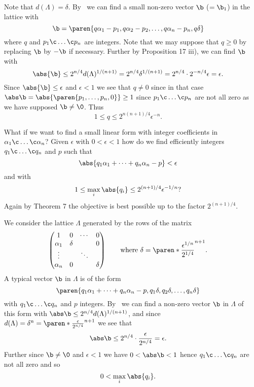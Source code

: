 Note that $d(\Lambda)=\delta$.  By \LLL\ we can find a small non-zero vector $\b$ ($=\b_1$) in the lattice with
\[ \b = \paren{q\alpha_1-p_1,q\alpha_2-p_2,\dotsc,q\alpha_n-p_n,q\delta} \]
where $q$ and $p_1\c \dotsc\c p_n$ are integers.  Note that we may suppose that $q\geq0$ by replacing $\b$ by $-\b$ if necessary.  Further by Proposition 17 iii), we can find $\b$ with
\[ \abs{\b} \leq 2^{n/4} d(\Lambda)^{1/(n+1)} = 2^{n/4}\delta^{1/(n+1)} = 2^{n/4}\cdot 2^{-n/4} \epsilon = \epsilon . \]
Since $\abs{\b}\leq\epsilon$ and $\epsilon<1$ we see that $q\neq0$ since in that case $\abs\b=\abs{\paren{p_1,\dotsc,p_n,0}}\geq1$ since $p_1\c \dotsc\c p_n$ are not all zero as we have supposed $\b\neq\0$.  Thus
\[ 1 \leq q \leq 2^{n(n+1)/4} \epsilon^{-n} . \]

What if we want to find a small linear form with integer coefficients in $\alpha_1\c \dotsc\c \alpha_n$?  Given $\epsilon$ with $0<\epsilon<1$ how do we find efficiently integers $q_1\c \dotsc\c q_n$ and $p$ such that
\[ \abs{q_1\alpha_1+\dotsb+q_n\alpha_n-p} < \epsilon \]
and with
\[ 1 \leq \max_i \abs{q_i} \leq 2^{(n+1)/4} \epsilon^{-1/n} ? \]
Again by Theorem 7 the objective is best possible up to the factor $2^{(n+1)/4}$.

We consider the lattice $\Lambda$ generated by the rows of the matrix
\[ \begin{pmatrix}
1 & 0 & \cdots & 0 \\
\alpha_1 & \delta & & 0 \\
\vdots &        & \ddots &        \\
\alpha_n & 0 &        & \delta
\end{pmatrix} \qquad\text{where $\delta=\paren*{\frac{\epsilon^{1/n}}{2^{1/4}}}^{n+1}$} . \]
A typical vector $\b$ in $\Lambda$ is of the form
\[ \paren{q_1\alpha_1+\dotsb+q_n\alpha_n-p,q_1\delta,q_2\delta,\dotsc,q_n\delta} \]
with $q_1\c \dotsc\c q_n$ and $p$ integers.  By \LLL\ we can find a non-zero vector $\b$ in $\Lambda$ of this form with $\abs\b\leq 2^{n/4} d(\Lambda)^{1/(n+1)}$, and since $d(\Lambda)=\delta^n=\paren*{\frac{\epsilon}{2^{n/4}}}^{n+1}$ we see that
\[ \abs\b \leq 2^{n/4} \cdot \frac{\epsilon}{2^{n/4}} = \epsilon . \]
Further since $\b\neq\0$ and $\epsilon<1$ we have $0<\abs\b<1$ hence $q_1\c \dotsc\c q_n$ are not all zero and so
\[ 0 < \max_i \abs{q_i} . \]

